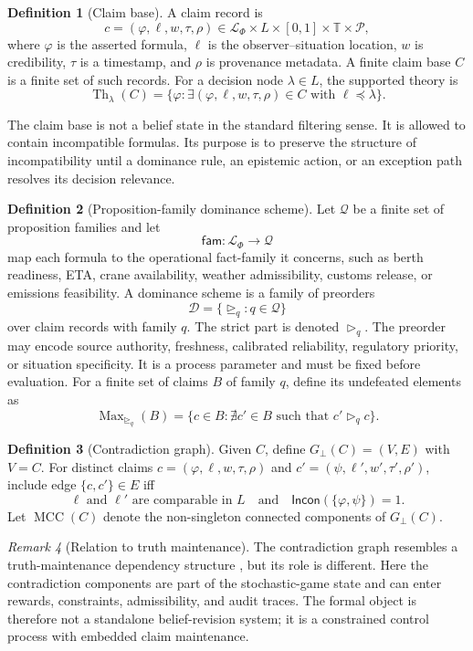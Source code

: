 \documentclass[11pt]{article}
\newcommand{\MCC}{\operatorname{MCC}}
\newcommand{\Lang}{\mathcal L}
\newcommand{\Incon}{\mathsf{Incon}}
\newcommand{\Fam}{\mathsf{fam}}
\newcommand{\Th}{\operatorname{Th}}
\newcommand{\1}{\mathbf{1}}
\theoremstyle{definition}
\newtheorem{definition}{Definition}[section]
\theoremstyle{plain}
\theoremstyle{remark}
\newtheorem{remark}[definition]{Remark}
\begin{document}
\begin{definition}[Claim base]
\label{def:claimbase}
A claim record is
\[
c=(\varphi,\ell,w,\tau,\rho)
\in \Lang_\Phi\times L\times[0,1]\times\mathbb T\times\mathcal P,
\]
where $\varphi$ is the asserted formula, $\ell$ is the observer--situation location, $w$ is credibility, $\tau$ is a timestamp, and $\rho$ is provenance metadata. A finite claim base $C$ is a finite set of such records. For a decision node $\lambda\in L$, the supported theory is
\[
\Th_{\lambda}(C)=\{\varphi: \exists(\varphi,\ell,w,\tau,\rho)\in C\text{ with }\ell\preceq \lambda\}.
\]
\end{definition}

The claim base is not a belief state in the standard filtering sense. It is allowed to contain incompatible formulas. Its purpose is to preserve the structure of incompatibility until a dominance rule, an epistemic action, or an exception path resolves its decision relevance.

\begin{definition}[Proposition-family dominance scheme]
\label{def:dominance}
Let $\mathcal Q$ be a finite set of proposition families and let
\[
\Fam:\Lang_\Phi\to\mathcal Q
\]
map each formula to the operational fact-family it concerns, such as berth readiness, ETA, crane availability, weather admissibility, customs release, or emissions feasibility. A dominance scheme is a family of preorders
\[
\mathcal D=\{\unrhd_q:q\in\mathcal Q\}
\]
over claim records with family $q$. The strict part is denoted $\rhd_q$. The preorder may encode source authority, freshness, calibrated reliability, regulatory priority, or situation specificity. It is a process parameter and must be fixed before evaluation. For a finite set of claims $B$ of family $q$, define its undefeated elements as
\[
\operatorname{Max}_{\unrhd_q}(B)
=
\{c\in B:\nexists c'\in B\text{ such that }c'\rhd_q c\}.
\]
\end{definition}

\begin{definition}[Contradiction graph]
\label{def:contradiction}
Given $C$, define $G_{\bot}(C)=(V,E)$ with $V=C$. For distinct claims $c=(\varphi,\ell,w,\tau,\rho)$ and $c'=(\psi,\ell',w',\tau',\rho')$, include edge $\{c,c'\}\in E$ iff
\[
\ell \text{ and }\ell' \text{ are comparable in }L
\quad\text{and}\quad
\Incon(\{\varphi,\psi\})=1.
\]
Let $\MCC(C)$ denote the non-singleton connected components of $G_{\bot}(C)$.
\end{definition}

\begin{remark}[Relation to truth maintenance]
The contradiction graph resembles a truth-maintenance dependency structure \citep{Doyle1979,deKleer1986,McAllester1990TMS}, but its role is different. Here the contradiction components are part of the stochastic-game state and can enter rewards, constraints, admissibility, and audit traces. The formal object is therefore not a standalone belief-revision system; it is a constrained control process with embedded claim maintenance.
\end{remark}
\end{document}
